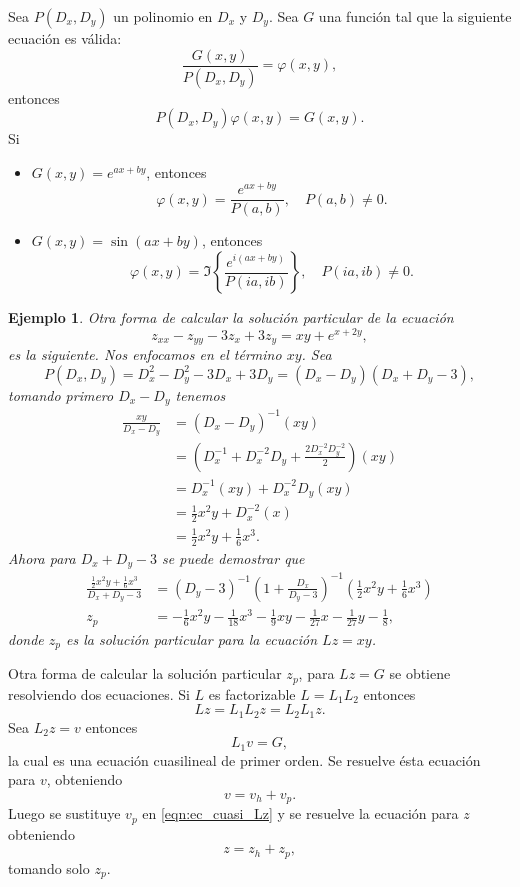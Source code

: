 \documentclass[11pt,letterpaper,draft]{report}
\newtheorem{example}[defn]{Ejemplo}
\newcommand\<{\langle}
\renewcommand\>{\rangle}
\renewcommand\phi\varphi
\begin{document}
Sea $P(D_x,D_y)$ un polinomio en $D_x$ y $D_y$. Sea $G$ una
función tal que la siguiente ecuación es válida:
\[
\frac{G(x,y)}{P(D_x,D_y)} = \phi(x,y),
\] 
entonces
\[
P(D_x,D_y) \phi(x,y) = G(x,y).
\] 
Si
\begin{itemize}
  \item $\displaystyle G(x,y) = e^{ax+by}$, entonces
    \[
    \phi(x,y) = \frac{e^{ax+by}}{P(a,b)}, \quad P(a,b) \neq
    0.
    \] 
  \item $\displaystyle G(x,y) = \sin(ax+by)$, entonces
    \[
    \phi(x,y) = \Im \left\{
      \frac{e^{i(ax+by)}}{P(ia,ib)}
    \right\}, \quad P(ia, ib) \neq 0.
    \] 
\end{itemize}
\begin{example}
  Otra forma de calcular la solución particular de la
  ecuación
  \[
  z_{xx} - z_{yy} - 3z_x + 3z_y = xy + e^{x+2y},
  \] 
  es la siguiente. Nos enfocamos en el término $xy$. Sea
  \[
  P(D_x,D_y) = D_x^2 - D_y^2 - 3D_x + 3D_y = (D_x -
  D_y)(D_x+D_y-3),
  \] 
  tomando primero $D_x - D_y$ tenemos
  \begin{align*}
    \frac{xy}{D_x-D_y} &= (D_x - D_y)^{-1}(xy)\\
                       &= \left(
                         D_x^{-1} + D_x^{-2}D_y +
                         \frac{2D_x^{-2}D_y^{-2}}{2}
                       \right)(xy)\\
                       &= D_x^{-1}(xy) + D_x^{-2}D_y(xy)\\
                       &= \frac{1}{2}x^2y + D_x^{-2}(x)\\
                       &= \frac{1}{2}x^2y + \frac{1}{6}x^3.
  \end{align*}
  Ahora para $D_x+D_y-3$ se puede demostrar que
  \begin{align*}
    \frac{\frac{1}{2}x^2y + \frac{1}{6}x^3}{D_x+D_y-3}
    &= (D_y-3)^{-1}\left(1+\frac{D_x}{D_y-3}\right)^{-1}
       \left(\frac{1}{2}x^2y+\frac{1}{6}x^3\right)\\
    z_p &= -\frac{1}{6}x^2y - \frac{1}{18}x^3 - \frac{1}{9}xy -
    \frac{1}{27}x - \frac{1}{27}y - \frac{1}{8},
  \end{align*}
  donde $z_p$ es la solución particular para la ecuación $Lz
  = xy$.
\end{example}

Otra forma de calcular la solución particular $z_p$, para
$Lz = G$ se obtiene resolviendo dos ecuaciones. Si $L$ es
factorizable $L = L_1 L_2$ entonces
\[
Lz = L_1L_2z = L_2L_1z.
\] 
Sea $L_2z = v$ entonces
\begin{equation}
  \label{eqn:ec_cuasi_Lz}
  L_1v = G,
\end{equation}
la cual es una ecuación cuasilineal de primer orden. Se
resuelve ésta ecuación para $v$, obteniendo
\[
v = v_h + v_p.
\] 
Luego se sustituye $v_p$ en \ref{eqn:ec_cuasi_Lz} y se
resuelve la ecuación para $z$ obteniendo
\[
z = z_h + z_p,
\]
tomando solo $z_p$.
\end{document}
